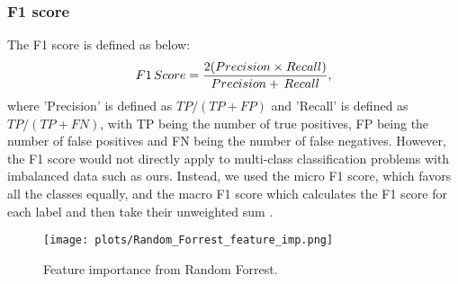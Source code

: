 \documentclass[sigconf]{acmart}
\begin{document}
\subsubsection{F1 score}
The F1 score is defined as below:
\begin{equation}
\notag
    F1\,Score = \frac{2(Precision \times Recall)}{Precision +\,Recall},
\end{equation}
where 'Precision' is defined as $TP/(TP + FP)$ and 'Recall' is defined as $TP/(TP+FN)$, with TP being the number of true positives, FP being the number of false positives and FN being the number of false negatives. However, the F1 score would not directly apply to multi-class classification problems with imbalanced data such as ours. Instead, we used the micro F1 score, which favors all the classes equally, and the macro F1 score which calculates the F1 score for each label and then take their unweighted sum \cite{scikit-learn}.



\begin{figure}[h]
    \centering
    \texttt{[image: plots/Random\_Forrest\_feature\_imp.png]}
    \caption{Feature importance from Random Forrest.}
    \label{fig:feature_importance}
\end{figure}
\end{document}
